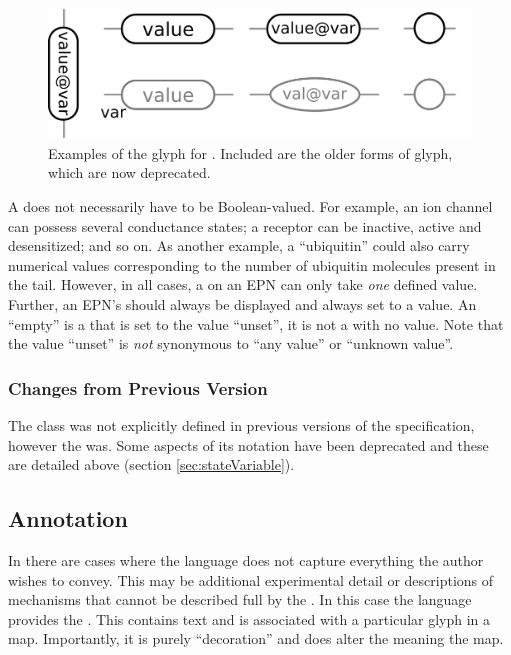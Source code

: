 \begin{figure}[H]
  \centering
  \includegraphics[width=\textwidth]{images/stateVariable}
  \caption{Examples of the \PD glyph for . Included are the older forms of glyph, which are now deprecated.}
  \label{fig:state-var}
\end{figure}

A  does not necessarily have to be
Boolean-valued.  For example, an ion channel can possess several
conductance states; a receptor can be inactive, active and
desensitized; and so on.  As another example, a 
``ubiquitin'' could also carry numerical values corresponding to the
number of ubiquitin molecules present in the tail.  However, in all
cases, a  on an EPN can only take \emph{one}
defined value.  Further, an EPN's  should always
be displayed and always set to a value.  An ``empty''  is a  that is set to the value
``unset'', it is not a  with no value. Note that
the value ``unset'' is \emph{not} synonymous to ``any value'' or
``unknown value''.


\subsubsection{Changes from Previous Version}

The  class was not explicitly defined in
previous versions of the specification, however the  was. Some aspects of its notation have been deprecated and
these are detailed above (section \ref{sec:stateVariable}).

\subsection{Annotation}
\label{defn:Annotation}

In \SBGNPDLone there are cases where the language does not capture
everything the author wishes to convey. This may be additional
experimental detail or descriptions of mechanisms that cannot be
described full by the \PDl. In this case the language provides the
. This contains text and is associated with a
particular glyph in a map. Importantly, it is purely ``decoration''
and does alter the meaning the map.



